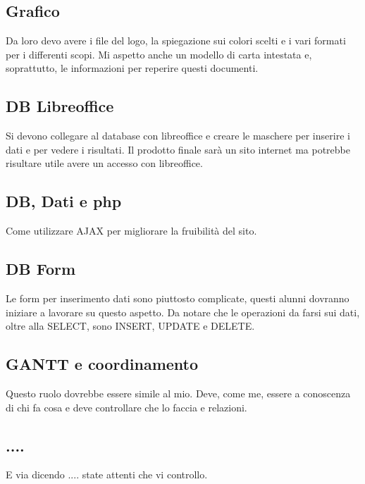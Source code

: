 \subsection*{Grafico}

Da loro devo avere i file del logo, la spiegazione sui colori scelti e i vari formati per i differenti scopi. Mi aspetto anche un modello di carta intestata e, soprattutto, le informazioni per reperire questi documenti.

\subsection*{DB Libreoffice}

Si devono collegare al database con libreoffice e creare le maschere per inserire i dati e per vedere i risultati. Il prodotto finale sarà un sito internet ma potrebbe risultare utile avere un accesso con libreoffice.

\subsection*{DB, Dati e php}

Come utilizzare A\+J\+AX per migliorare la fruibilità del sito.

\subsection*{DB Form}

Le form per inserimento dati sono piuttosto complicate, questi alunni dovranno iniziare a lavorare su questo aspetto. Da notare che le operazioni da farsi sui dati, oltre alla S\+E\+L\+E\+CT, sono I\+N\+S\+E\+RT, U\+P\+D\+A\+TE e D\+E\+L\+E\+TE.

\subsection*{G\+A\+N\+TT e coordinamento}

Questo ruolo dovrebbe essere simile al mio. Deve, come me, essere a conoscenza di chi fa cosa e deve controllare che lo faccia e relazioni.

\subsection*{....}

E via dicendo .... state attenti che vi controllo. 